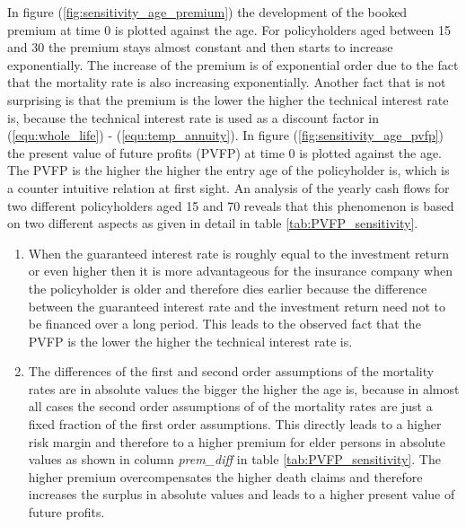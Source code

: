 In figure (\ref{fig:sensitivity_age_premium}) the development of the booked premium at time 0 is plotted against the age. For policyholders aged between 15 and 30 the premium stays almost constant and then starts to increase exponentially. The increase of the premium is of exponential order due to the fact that the mortality rate is also increasing exponentially. Another fact that is not surprising is that the premium is the lower the higher the technical interest rate is, because the technical interest rate is used as a discount factor in (\ref{equ:whole_life}) - (\ref{equ:temp_annuity}). In figure  (\ref{fig:sensitivity_age_pvfp}) the present value of future profits (PVFP) at time 0 is plotted against the age. The PVFP is the higher the higher the entry age of the policyholder is, which is a counter intuitive relation at first sight. An analysis of the yearly cash flows for two different policyholders aged 15 and 70 reveals that this phenomenon is based on two different aspects as given in detail in table \ref{tab:PVFP_sensitivity}. 
\begin{enumerate}
	\item When the guaranteed interest rate is roughly equal to the investment return or even higher then it is more 		advantageous for the insurance company when the policyholder is older and therefore dies earlier because the difference between the guaranteed interest rate and the investment return need not to be financed over a long period. This leads to the observed fact that the PVFP is the lower the higher the technical interest rate is.
	\item The differences of the first and second order assumptions of the mortality rates are in absolute values the bigger the higher the age is, because in almost all cases the second order assumptions of of the mortality rates are just a fixed fraction of the first order assumptions. This directly leads to a higher risk margin and therefore to a higher premium for elder persons in absolute values as shown in column \textit{prem\_diff} in table \ref{tab:PVFP_sensitivity}. The  higher premium overcompensates the higher death claims and therefore increases the surplus in absolute values and leads to a higher present value of future profits. 
\end{enumerate}
